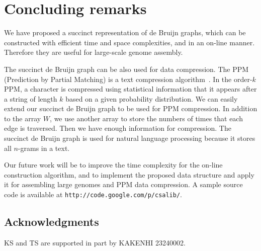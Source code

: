 
\section{Concluding remarks}\label{p1-sec:conclusion}
We have proposed a succinct representation of de Bruijn graphs,
which can be constructed with efficient time and space complexities,
and in an on-line manner.
Therefore they are useful for large-scale genome assembly.

The succinct de Bruijn graph can be also used for data compression.
The PPM (Prediction by Partial Matching) is a text compression algorithm~\cite{CleWit84}.
In the order-$k$ PPM, a character is compressed using statistical information
that it appears after a string of length $k$ based on a given probability distribution.
We can easily extend our succinct de Bruijn graph to be used for PPM compression.
In addition to the array $W$, we use another array to store the numbers of times
that each edge is traversed.  Then we have enough information for compression.
The succinct de Bruijn graph is used for natural language processing because
it stores all $n$-grams in a text.

Our future work will be to improve the time complexity for the on-line construction
algorithm, and to implement the proposed data structure and apply it
for assembling large genomes and PPM data compression.
A sample source code is available at {\tt http://code.google.com/p/csalib/}.



\subsection*{Acknowledgments}
KS and TS are supported in part by KAKENHI 23240002.





